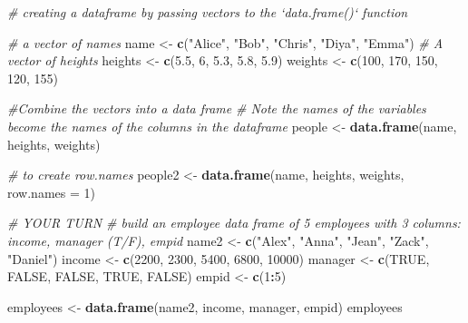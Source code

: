 \documentclass[
]{article}
\newenvironment{Shaded}{\begin{snugshade}}{\end{snugshade}}
\newcommand{\CommentTok}[1]{\textcolor[rgb]{0.56,0.35,0.01}{\textit{#1}}}
\newcommand{\DataTypeTok}[1]{\textcolor[rgb]{0.13,0.29,0.53}{#1}}
\newcommand{\DecValTok}[1]{\textcolor[rgb]{0.00,0.00,0.81}{#1}}
\newcommand{\FloatTok}[1]{\textcolor[rgb]{0.00,0.00,0.81}{#1}}
\newcommand{\KeywordTok}[1]{\textcolor[rgb]{0.13,0.29,0.53}{\textbf{#1}}}
\newcommand{\NormalTok}[1]{#1}
\newcommand{\OperatorTok}[1]{\textcolor[rgb]{0.81,0.36,0.00}{\textbf{#1}}}
\newcommand{\OtherTok}[1]{\textcolor[rgb]{0.56,0.35,0.01}{#1}}
\newcommand{\StringTok}[1]{\textcolor[rgb]{0.31,0.60,0.02}{#1}}
\begin{document}
\begin{Shaded}
\begin{Highlighting}[]
\CommentTok{# creating a dataframe by passing vectors to the `data.frame()` function}

\CommentTok{# a vector of names}
\NormalTok{name <-}\StringTok{ }\KeywordTok{c}\NormalTok{(}\StringTok{"Alice"}\NormalTok{, }\StringTok{"Bob"}\NormalTok{, }\StringTok{"Chris"}\NormalTok{, }\StringTok{"Diya"}\NormalTok{, }\StringTok{"Emma"}\NormalTok{)}
\CommentTok{# A vector of heights}
\NormalTok{heights <-}\StringTok{ }\KeywordTok{c}\NormalTok{(}\FloatTok{5.5}\NormalTok{, }\DecValTok{6}\NormalTok{, }\FloatTok{5.3}\NormalTok{, }\FloatTok{5.8}\NormalTok{, }\FloatTok{5.9}\NormalTok{)}
\NormalTok{weights <-}\StringTok{ }\KeywordTok{c}\NormalTok{(}\DecValTok{100}\NormalTok{, }\DecValTok{170}\NormalTok{, }\DecValTok{150}\NormalTok{, }\DecValTok{120}\NormalTok{, }\DecValTok{155}\NormalTok{)}

\CommentTok{#Combine the vectors into a data frame}
\CommentTok{# Note the names of the variables become the names of the columns in the dataframe}
\NormalTok{people <-}\StringTok{ }\KeywordTok{data.frame}\NormalTok{(name, heights, weights)}

\CommentTok{# to create row.names}
\NormalTok{people2 <-}\StringTok{ }\KeywordTok{data.frame}\NormalTok{(name, heights, weights, }\DataTypeTok{row.names =} \DecValTok{1}\NormalTok{)}

\CommentTok{# YOUR TURN}
\CommentTok{# build an employee data frame of 5 employees with 3 columns: income, manager (T/F), empid }
\NormalTok{name2 <-}\StringTok{ }\KeywordTok{c}\NormalTok{(}\StringTok{"Alex"}\NormalTok{, }\StringTok{"Anna"}\NormalTok{, }\StringTok{"Jean"}\NormalTok{, }\StringTok{"Zack"}\NormalTok{, }\StringTok{"Daniel"}\NormalTok{)}
\NormalTok{income <-}\StringTok{ }\KeywordTok{c}\NormalTok{(}\DecValTok{2200}\NormalTok{, }\DecValTok{2300}\NormalTok{, }\DecValTok{5400}\NormalTok{, }\DecValTok{6800}\NormalTok{, }\DecValTok{10000}\NormalTok{)}
\NormalTok{manager <-}\StringTok{ }\KeywordTok{c}\NormalTok{(}\OtherTok{TRUE}\NormalTok{, }\OtherTok{FALSE}\NormalTok{, }\OtherTok{FALSE}\NormalTok{, }\OtherTok{TRUE}\NormalTok{, }\OtherTok{FALSE}\NormalTok{)}
\NormalTok{empid <-}\StringTok{ }\KeywordTok{c}\NormalTok{(}\DecValTok{1}\OperatorTok{:}\DecValTok{5}\NormalTok{)}

\NormalTok{employees <-}\StringTok{ }\KeywordTok{data.frame}\NormalTok{(name2, income, manager, empid)}
\NormalTok{employees}
\end{Highlighting}
\end{Shaded}
\end{document}
